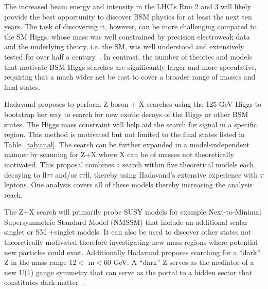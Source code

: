\label{ZplusX}
The increased beam energy and intensity in the LHC's Run 2 and 3 will likely provide the best 
opportunity to discover BSM physics for at least the next ten years.
The task of discovering it, however, can be more challenging compared to the SM Higgs, whose mass was well constrained by precision electroweak data and the underlying theory, i.e. the SM, 
was well understood and extensively tested for over half a century~\cite{eng,higgs1,higgs2,higgs3}. 
In contrast, the number of theories and models that motivate BSM Higgs searches are significantly larger and more speculative, requiring that a much wider net be cast to cover a broader range of masses and final states. 

Hadavand proposes to perform Z boson + X searches using the 125 GeV Higgs to bootstrap her way to search for new exotic decays of the Higgs or other BSM states.  
The Higgs mass constraint will help aid the search for signal in a specific region.  %
This method is motivated but not limited to the final states listed in Table~\ref{tab:anal}. The search can be further expanded in a model-independent manner by scanning for Z+X where X can be of masses not theoretically motivated.
This proposal combines a search within five theoretical models each decaying to ll$\tau\tau$ and/or $\tau\tau$ll, thereby using Hadavand's extensive experience with $\tau$ leptons.  One analysis
covers all of these models thereby increasing the analysis reach.  

The Z+X search will primarily probe SUSY models for example Next-to-Minimal Supersymmetric Standard Model (NMSSM) that include an additional scalar singlet or SM +singlet models.  It can also be used to discover other states not theoretically motivated therefore investigating new mass regions where potential new particles could exist.
Additionally Hadavand proposes searching for a ``dark'' Z in the mass range $12<$ m$<60$ GeV. A ``dark'' Z serves as the mediator of a new U(1) gauge symmetry that can serve as the portal to a hidden sector that constitutes dark matter~\cite{zdark}. 


